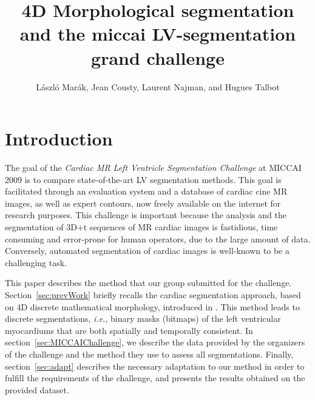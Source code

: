 \documentclass{llncs}
\newcommand{\ie}[0]{{\em i.e.}\xspace}
\begin{document}
%
\title{4D Morphological segmentation and the miccai LV-segmentation
  grand challenge}
%
%
\author{L\'aszl\'o Mar\'ak, Jean Cousty, Laurent Najman, and Hugues Talbot}
%
\authorrunning{}   %
%
%

\maketitle              %

\section{Introduction}
The goal of the {\em Cardiac MR Left Ventricle Segmentation Challenge} at MICCAI
2009 is to compare state-of-the-art LV segmentation methods. This goal is
facilitated through an evaluation system and a database of cardiac cine MR
images, as well as expert contours, now freely available on the
internet for research purposes.  This challenge is important because the
analysis and the segmentation of 3D+t sequences of MR cardiac images is
fastidious, time consuming and error-prone for human operators, due to the large
amount of data. Conversely, automated segmentation of cardiac images is
well-known to be a challenging task.

This paper describes the method that our group submitted for
the challenge. Section~\ref{sec:prevWork} briefly recalls the cardiac
segmentation approach, based on 4D discrete mathematical morphology,
introduced in \cite{CNC-et-al07}. This method leads
to discrete segmentations, \ie, binary masks (bitmaps) of the left
ventricular myocardiums that are both spatially and temporally
consistent. In section~\ref{sec:MICCAIChallenge}, we describe the data
provided by the organizers of the challenge and the method they use to
assess all segmentations. Finally, section~\ref{sec:adapt}
describes the necessary adaptation to our method in order to
fulfill the requirements of the challenge, and presents the results
obtained on the provided dataset.
%
\end{document}
